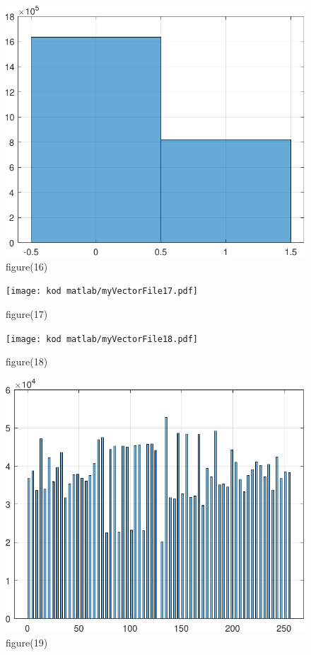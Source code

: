 \documentclass[10pt,a4paper,twoside]{article}%
\begin{document}
\begin{figure}[H]
    \centering
    \includegraphics[width=1\linewidth]{kod matlab/myVectorFile16.pdf}
\caption{figure(16)}
    \label{fig:obr1}
\end{figure}

\begin{figure}[H]
    \centering
    \texttt{[image: kod matlab/myVectorFile17.pdf]}
\caption{figure(17)}
    \label{fig:obr1}
\end{figure}

\begin{figure}[H]
    \centering
    \texttt{[image: kod matlab/myVectorFile18.pdf]}
\caption{figure(18)}
    \label{fig:obr1}
\end{figure}

\begin{figure}[H]
    \centering
    \includegraphics[width=1\linewidth]{kod matlab/myVectorFile19.pdf}
\caption{figure(19)}
    \label{fig:obr1}
\end{figure}
\end{document}

